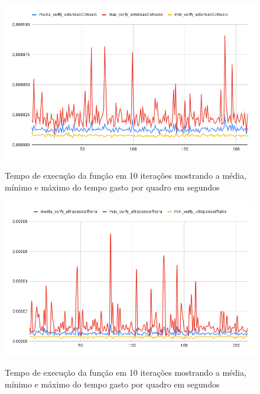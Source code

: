 \begin{figure}[H]
	\centering
	\caption{Tempo de execução da função  em 10 iterações mostrando a média, mínimo e máximo do tempo gasto por quadro em segundos}
	\includegraphics[scale=0.45]{figuras/grafico/extensaoCotovelo.png}
	\label{graf:G7}
\end{figure}


\begin{figure}[H]
	\centering
	\caption{Tempo de execução da função  em 10 iterações mostrando a média, mínimo e máximo do tempo gasto por quadro em segundos}
	\includegraphics[scale=0.55]{figuras/grafico/ultrapassarBarra.png}
	\label{graf:G8}
\end{figure}



